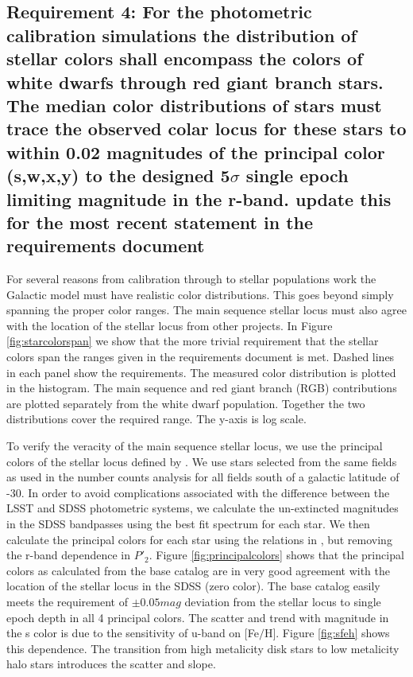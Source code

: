 \documentclass[]{article}
\begin{document}
\subsection{Requirement 4: For the photometric calibration simulations
the distribution of stellar colors shall encompass the colors of white dwarfs through red giant branch stars.
The median color distributions of stars must trace the observed colar locus for these stars to within 0.02 magnitudes
of the principal color (s,w,x,y) to the designed 5$\sigma$ single epoch limiting magnitude in the r-band.
{\bf update this for the most recent statement in the requirements document}}
For several reasons from calibration through to stellar populations work the Galactic model must have realistic color distributions.
This goes beyond simply spanning the proper color ranges.  The main sequence stellar locus must also agree with the location of the
stellar locus from other projects.  In Figure \ref{fig:starcolorspan} we show that the more trivial requirement that the stellar
colors span the ranges given in the requirements document is met.  Dashed lines in each panel show the requirements.  The measured
color distribution is plotted in the histogram.  The main sequence and red giant branch (RGB) contributions are plotted separately from
the white dwarf population.  Together the two distributions cover the required range.  The y-axis is log scale.

To verify the veracity of the main sequence stellar locus, we use the principal colors of the stellar locus defined by \cite{ivezic04}.
We use stars selected from the same fields as used in the number counts analysis for all fields south of a galactic latitude of -30.
In order to avoid complications associated with the difference between the LSST and SDSS photometric systems, we calculate the un-extincted 
magnitudes in the SDSS bandpasses using the best fit spectrum for each star.  We then calculate
the principal colors for each star using the relations in \cite{ivezic04}, but removing the r-band dependence in $P\prime_{2}$.  Figure
\ref{fig:principalcolors} shows that the principal colors as calculated from the base catalog are in very good agreement with
the location of the stellar locus in the SDSS (zero color).  The base catalog easily meets the requirement of $\pm0.05mag$ deviation
from the stellar locus to single epoch depth in all 4 principal colors.  The scatter and trend with magnitude in the s color is due to 
the sensitivity of u-band on $[$Fe$/$H$]$.  Figure \ref{fig:sfeh} shows this dependence.  The transition from high metalicity disk stars to low 
metalicity halo stars introduces the scatter and slope.
\end{document}
